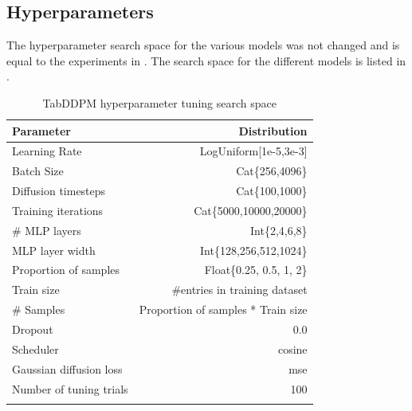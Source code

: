 \subsection{Hyperparameters}
The hyperparameter search space for the various models was not changed and is equal to the experiments in \cite{kotelnikov2022TabDDPMModellingTabular}.
The search space for the different models is listed in . 
\begin{table}[h]
	\centering
	\begin{tabular}{lr}
		\toprule
		Parameter               & Distribution                       \\
		\midrule
		Learning Rate           & LogUniform[1e-5,3e-3]              \\
		Batch Size              & Cat\{256,4096\}                    \\
		Diffusion timesteps     & Cat\{100,1000\}                    \\
		Training iterations     & Cat\{5000,10000,20000\}            \\
		\# MLP layers           & Int\{2,4,6,8\}                     \\
		MLP layer width         & Int\{128,256,512,1024\}            \\
		Proportion of samples   & Float\{0.25, 0.5, 1, 2\}           \\
		\midrule
		Train size              & \#entries in training dataset      \\
		\# Samples              & Proportion of samples * Train size \\
		Dropout                 & 0.0                                \\
		Scheduler               & cosine                             \\
		Gaussian diffusion loss & mse                                \\
		\midrule
		Number of tuning trials & 100                                \\
		\bottomrule
		\multicolumn{2}{c}{}\\[-0.6em]
	\end{tabular}
	\caption[TabDDPM Hyperparameter Search Space]{TabDDPM \model hyperparameter tuning search space \cite{kotelnikov2022TabDDPMModellingTabular}}
	\label{tab:diff_tune}
\end{table}
\newpage

